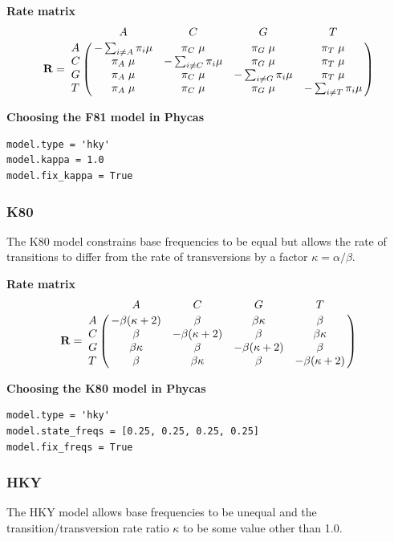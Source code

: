 \documentclass[10pt]{article}
\newcommand{\Rii}[1]{-\sum_{i \neq #1} \pi_i \mu}
\begin{document}
{\bf Rate matrix}
$${\bf R} = \bordermatrix{ &       A      &       C       &       G       &       T       \cr
                         A &    \Rii{A}   & \pi_C \; \mu  & \pi_G \; \mu  & \pi_T \; \mu  \cr
                         C & \pi_A \; \mu &    \Rii{C}    & \pi_G \; \mu  & \pi_T \; \mu  \cr
                         G & \pi_A \; \mu & \pi_C \; \mu  &    \Rii{G}    & \pi_T \; \mu  \cr
                         T & \pi_A \; \mu & \pi_C \; \mu  & \pi_G \; \mu  &     \Rii{T}   \cr}$$                                                         

{\bf Choosing the F81 model in Phycas}
\begin{verbatim}
model.type = 'hky'
model.kappa = 1.0
model.fix_kappa = True
\end{verbatim}

\subsubsection{K80}
The K80 model \citep{Kimura1980} constrains base frequencies to be equal but allows the rate of transitions to differ from the rate of transversions by a factor $\kappa = \alpha/\beta$.

{\bf Rate matrix}
$${\bf R} = \bordermatrix{ &         A          &         C          &        G          &         T          \cr
                         A & -\beta(\kappa + 2) &  \beta             &  \beta \kappa     &  \beta             \cr
                         C &  \beta             & -\beta(\kappa + 2) &  \beta            &  \beta \kappa      \cr
                         G &  \beta \kappa      &  \beta             & -\beta(\kappa + 2)&  \beta             \cr
                         T &  \beta             &  \beta \kappa      &  \beta            & -\beta(\kappa + 2) \cr}$$


{\bf Choosing the K80 model in Phycas}
\begin{verbatim}
model.type = 'hky'
model.state_freqs = [0.25, 0.25, 0.25, 0.25]
model.fix_freqs = True
\end{verbatim}

\subsubsection{HKY}
The HKY model \citep{HasegawaKishinoYano1985} allows base frequencies to be unequal and the transition/transversion rate ratio $\kappa$ to be some value other than 1.0.
\end{document}
